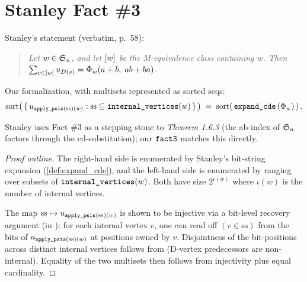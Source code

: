 \section{Stanley Fact \#3}

\begin{theorem}
  \label{thm:fact3}
  \rocqok
  Stanley's statement (verbatim, p.~58):
  \begin{quote}
    \emph{Let $w \in \mathfrak{S}_n$, and let $[w]$ be the M-equivalence
    class containing $w$.  Then
    $\sum_{v \in [w]} u_{D(v)} =
    \Phi_{w}(a + b,\; ab + ba)$.}
  \end{quote}
  Our formalization, with multisets represented as sorted seqs:
  \[
    \mathrm{sort}\!\left(\,\{\,u_{\texttt{apply\_psis}(\mathrm{ss})(w)} :
      \mathrm{ss} \subseteq \texttt{internal\_vertices}(w)\,\}\,\right)
    \;=\;
    \mathrm{sort}\!\left(\,\texttt{expand\_cde}\,(\Phi_{w})\,\right).
  \]

  Stanley uses Fact \#3 as a stepping stone to \emph{Theorem 1.6.3}
  (the ab-index of $\mathfrak{S}_n$ factors through the cd-substitution); our
  $\texttt{fact3}$ matches this directly.

  \begin{proof}[Proof outline]
    The right-hand side is enumerated by Stanley's bit-string
    expansion (\cref{def:expand_cde}), and the left-hand side is
    enumerated by ranging over subsets of $\texttt{internal\_vertices}(w)$.
    Both have size $2^{\iota(w)}$ where $\iota(w)$ is the number of
    internal vertices.

    The map $\mathrm{ss} \mapsto u_{\texttt{apply\_psis}(\mathrm{ss})(w)}$
    is shown to be injective via a bit-level recovery argument (in
    ): for each internal
    vertex $v$, one can read off $(v \in \mathrm{ss})$ from the bits
    of $u_{\texttt{apply\_psis}(\mathrm{ss})(w)}$ at positions
    owned by $v$.  Disjointness of the bit-positions across
    distinct internal vertices follows from
    (D-vertex predecessors are non-internal).  Equality of the two
    multisets then follows from injectivity plus equal cardinality.
  \end{proof}
\end{theorem}
